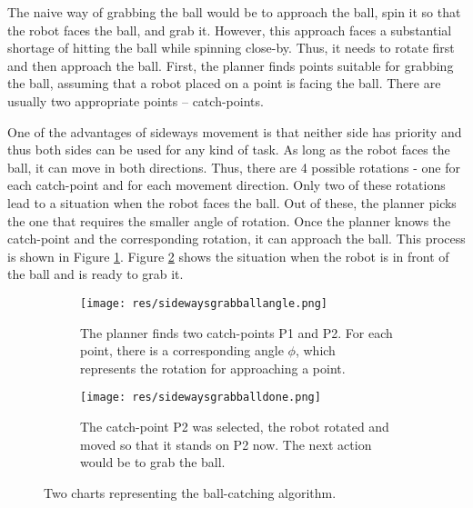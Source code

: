 The naive way of grabbing the ball would be to approach the ball, spin it so
that the robot faces the ball, and grab it. However, this approach faces a
substantial shortage of hitting the ball while spinning close-by. Thus, it
needs to rotate first and then approach the ball. First, the planner finds
points suitable for grabbing the ball, assuming that a robot placed on a point
is facing the ball. There are usually two appropriate points -- catch-points. 


One of the advantages of sideways movement is that neither side has priority
and thus both sides can be used for any kind of task. As long as the robot
faces the ball, it can move in both directions. Thus, there are 4 possible
rotations - one for each catch-point and for each movement direction.  Only two
of these rotations lead to a situation when the robot faces the ball. Out of
these, the planner picks the one that requires the smaller angle of rotation.
Once the planner knows the catch-point and the corresponding rotation, it can
approach the ball. This process is shown in Figure
\ref{fig:sidewaysgrabballangle}. Figure \ref{fig:sidewaysgrabballdone} shows
the situation when the robot is in front of the ball and is ready to grab it.


\begin{figure}[H]
	\begin{center}
	\begin{subfigure}{0.5\textwidth}
  		\texttt{[image: res/sidewaysgrabballangle.png]}
  		\caption{The planner finds two catch-points P1 and P2. For each point, there is a corresponding angle $\phi$, which represents the rotation for approaching a point.}
  		\label{fig:sidewaysgrabballangle}
	\end{subfigure}%
	\begin{subfigure}{0.5\textwidth}
  		\texttt{[image: res/sidewaysgrabballdone.png]}
  		\caption{The catch-point P2 was selected, the robot rotated and moved so that it stands on P2 now. The next action would be to grab the ball. }
  		\label{fig:sidewaysgrabballdone}
	\end{subfigure}%
	
	\caption{Two charts representing the ball-catching algorithm. }
	\label{fig:sidewaysgrabball}
	\end{center}
\end{figure}


